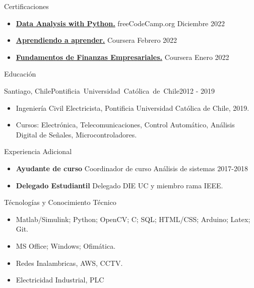 \documentclass[]{mcdowellcv}
\begin{document}
	\begin{cvsection}{Certificaciones}
		\begin{cvsubsection}{}{ }{}
			\begin{itemize}
				\item \textbf{\href{https://www.freecodecamp.org/certification/fcc97b8767b-5a07-4487-b743-fd7d5742d505/data-analysis-with-python-v7}{Data Analysis with Python.}} freeCodeCamp.org Diciembre 2022
				\item \textbf{\href{https://www.coursera.org/learn/aprendiendo-a-aprender}{Aprendiendo a aprender.}} Coursera Febrero 2022
				\item \textbf{\href{https://www.coursera.org/learn/finanzas-empresariales}{Fundamentos de Finanzas Empresariales.}} Coursera Enero 2022
			\end{itemize}
		\end{cvsubsection}
	\end{cvsection}
	
	\begin{cvsection}{Educación}
		\begin{cvsubsection}{Santiago, Chile}{\mbox{Pontificia Universidad Católica de Chile}}{2012 - 2019}
			\begin{itemize}
				\item Ingeniería Civil Electricista, Pontificia Universidad Católica de Chile, 2019.
				\item Cursos: Electrónica, Telecomunicaciones, Control Automático, Análisis Digital de Señales, Microcontroladores.
				\end{itemize}
		\end{cvsubsection}
	\end{cvsection}
	
	\begin{cvsection}{Experiencia Adicional}
		\begin{cvsubsection}{}{}{}	
			\begin{itemize}
				\item \textbf{Ayudante de curso} Coordinador de curso Análisis de sistemas 2017-2018
				\item \textbf{Delegado Estudiantil} Delegado DIE UC y miembro rama IEEE.
			\end{itemize}
		\end{cvsubsection}
	\end{cvsection}
	
	\begin{cvsection}{Técnologías y Conocimiento Técnico}
		\begin{cvsubsection}{}{}{}	
			\begin{itemize}
				\item Matlab/Simulink; Python; OpenCV; C; SQL; HTML/CSS; Arduino; Latex; Git.
				\item MS Office; Windows; Ofimática.
				\item Redes Inalambricas, AWS, CCTV.
				\item Electricidad Industrial, PLC
			\end{itemize}
		\end{cvsubsection}
	\end{cvsection}
	
\end{document}
